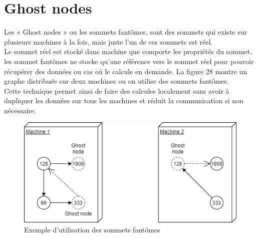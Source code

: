 \section{Ghost nodes}
Les « Ghost nodes » ou les sommets fantômes, sont des sommets qui existe sur plusieurs machines à la fois, mais juste l’un de ces sommets est réel.\\
Le sommet réel est stocké dans machine que comporte les propriétés du sommet, les sommet fantômes ne stocke qu’une référence vers le sommet réel pour pouvoir récupérer des données ou cas où le calcule en demande. La figure 28 montre un graphe distribuée sur deux machines ou on utilise des sommets fantômes.\\
Cette technique permet ainsi de faire des calcules localement sans avoir à dupliquer les données sur tous les machines et réduit la communication si non nécessaire.
\begin{figure}[H]  
  \centering
    \includegraphics[width=1\textwidth]{annexe/Figures/GhostNodes.png}
  \caption{Exemple d'utilisation des sommets fantômes}
\end{figure}
